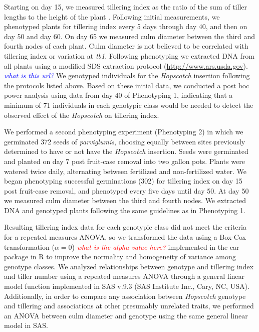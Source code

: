 \documentclass[11pt]{article}
\newcommand{\jri}[1]{\textcolor{blue}{ \emph{\scriptsize  #1}} }
\newcommand{\mbh}[1]{\textcolor{red}{ \emph{\scriptsize  #1}} }
\begin{document}
\begin{linenumbers}
\begin{flushleft}
Starting on day 15, we measured tillering index as the ratio of the sum of tiller lengths to the height of the plant \citep{Briggs2007}. Following initial measurements, we phenotyped plants for tillering index every 5 days through day 40, and then on day 50 and day 60. On day 65 we measured culm diameter between the third and fourth nodes of each plant. Culm diameter is not believed to be correlated with tillering index or variation at \emph{tb1}. Following phenotyping we extracted DNA from all plants using a modified SDS extraction protocol (\url{http://www.ars.usda.gov}). \jri{what is this url?} We genotyped individuals for the \emph{Hopscotch} insertion following the protocols listed above. Based on these initial data, we conducted a post hoc power analysis using data from day 40 of Phenotyping 1, indicating that a minimum of 71 individuals in each genotypic class would be needed to detect the observed effect of the \emph{Hopscotch} on tillering index.

We performed a second phenotyping experiment (Phenotyping 2) in which we germinated 372 seeds of \emph{parviglumis}, choosing equally between sites previously determined to have or not have the \emph{Hopscotch} insertion. Seeds were germinated and planted on day 7 post fruit-case removal into two gallon pots. Plants were watered twice daily, alternating between fertilized and non-fertilized water. We began phenotyping successful germinations (302) for tillering index on day 15 post fruit-case removal, and phenotyped every five days until day 50. At day 50 we measured culm diameter between the third and fourth nodes. We extracted DNA and genotyped plants following the same guidelines as in Phenotyping 1. 

Resulting tillering index data for each genotypic class did not meet the criteria for a repeated measures ANOVA, so we transformed the data using a Box-Cox transformation ($\alpha=0$) \mbh{what is the alpha value here?} implemented in the car package in R \citep{FoxWeisberg2011} to improve the normality and homogeneity of variance among genotype classes.  We analyzed relationships between genotype and tillering index and tiller number using a repeated measures ANOVA through a general linear model function implemented in SAS v.9.3 (SAS Institute Inc., Cary, NC, USA). Additionally, in order to compare any association between \emph{Hopscotch} genotype and tillering and associations at other presumably unrelated traits, we performed an ANOVA between culm diameter and genotype using the same general linear model in SAS.


\end{flushleft}
\end{linenumbers}
\end{document}
